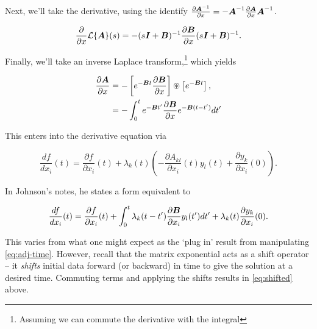 \documentclass[../primer.tex]{subfiles}
\begin{document}
\noindent Next, we'll take the derivative, using the identify
\(\frac{\partial\boldsymbol{A}^{-1}}{\partial
x}=\nobreak-\boldsymbol{A}^{-1}\frac{\partial\boldsymbol{A}}{\partial x}\boldsymbol{A}^{-1}\).

\begin{equation}
  \frac{\partial}{\partial x}\cL\{\mA\}(s) = %
    -(s\mI+\mB)^{-1}\frac{\partial\mB}{\partial x}(s\mI+\mB)^{-1}.
\end{equation}

\noindent Finally, we'll take an inverse Laplace transform,\footnote{Assuming we can
commute the derivative with the integral} which yields

\begin{equation}\begin{aligned}
  \frac{\partial\mA}{\partial x} &= -\left[e^{-\mB t}\frac{\partial\mB}{\partial x}\right] %
    \circledast \left[e^{-\mB t}\right], \\
    &= -\int_0^t e^{-\mB t'}\frac{\partial\mB}{\partial x}e^{-\mB(t-t')}dt'
\end{aligned}\end{equation}

This enters into the derivative equation via

\begin{equation}\label{eq:adj-time}
  \frac{df}{dx_i}(t) = \frac{\partial f}{\partial x_i}(t) + \lambda_k(t)%
    \left(-\frac{\partial A_{kl}}{\partial x_i}(t) y_l(t) + \frac{\partial y_k}{\partial x_i}(0)\right).
\end{equation}

In Johnson's notes, he states a form equivalent to

\begin{equation}\label{eq:shifted}
  \frac{df}{dx_i}(t) = \frac{\partial f}{\partial x_i}(t) + %
    \int_0^t\lambda_k(t-t')\frac{\partial\mB}{\partial x_i}y_l(t')dt' + %
    \lambda_k(t)\frac{\partial y_k}{\partial x_i}(0).
\end{equation}

This varies from what one might expect as the `plug in' result from manipulating
\eqref{eq:adj-time}. However, recall that the matrix exponential acts as a shift
operator -- it \emph{shifts} initial data forward (or backward) in time to give the
solution at a desired time. Commuting terms and applying the shifts results in
\eqref{eq:shifted} above.
\end{document}
